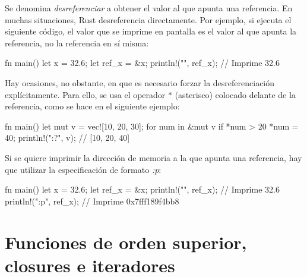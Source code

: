 Se denomina \textit{desreferenciar} a obtener el valor al que apunta una referencia. En muchas situaciones, Rust desreferencia directamente. Por ejemplo, si ejecuta el siguiente código, el valor que se imprime en pantalla es el valor al que apunta la referencia, no la referencia en sí misma:

\vspace{0.7em}
\begin{Codigo}
fn main() {
   let x = 32.6;
   let ref_x = &x;
   println!("{}", ref_x); // Imprime 32.6
}
\end{Codigo}

Hay ocasiones, no obstante, en que es necesario forzar la desreferenciación explícitamente. Para ello, se usa el operador $*$ (asterisco) colocado delante de la referencia, como se hace en el siguiente ejemplo:

\vspace{0.7em}
\begin{Codigo}
fn main() {
   let mut v = vec![10, 20, 30];
   for num in &mut v {
      if *num > 20 {
         *num = 40;
      }
   }
   println!("{:?}", v); // [10, 20, 40]
}
\end{Codigo}

Si se quiere imprimir la dirección de memoria a la que apunta una referencia, hay que utilizar la especificación de formato \textit{{:p}}:

\vspace{0.7em}
\begin{Codigo}
fn main() {
   let x = 32.6;
   let ref_x = &x;
   println!("{}", ref_x); // Imprime 32.6
   println!("{:p}", ref_x); // Imprime 0x7fff189f4bb8
}
\end{Codigo}



\chapter{Funciones de orden superior, closures e iteradores}
\label{ch_funciones}

